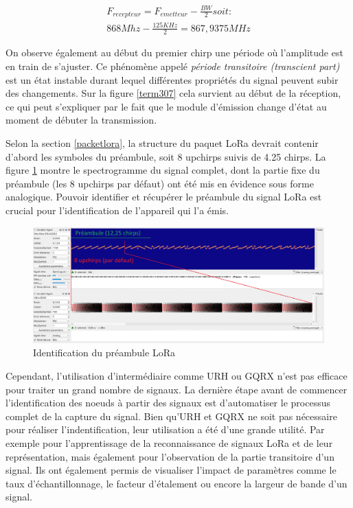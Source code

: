 \begin{align}
    F_{recepteur} = F_{emetteur} - \frac{BW}{2} soit: \\
    868Mhz - \frac{125KHz}{2} = 867,9375MHz
\end{align}

On observe également au début du premier chirp une période où l'amplitude est en train de s'ajuster. Ce phénomène appelé \textit{période transitoire (transcient part)} est un état instable durant lequel différentes propriétés du signal peuvent subir des changements. Sur la figure \ref{term307} cela survient au début de la réception, ce qui peut s'expliquer par le fait que le module d'émission change d'état au moment de débuter la transmission.

\vspace{0.1cm}

Selon la section \ref{packetlora}, la structure du paquet LoRa devrait contenir d'abord les symboles du préambule, soit 8 upchirps suivis de 4.25 chirps. La figure \ref{term308} montre le spectrogramme du signal complet, dont la partie fixe du préambule (les 8 upchirps par défaut) ont été mis en évidence sous forme analogique. Pouvoir identifier et récupérer le préambule du signal LoRa est crucial pour l'identification de l'appareil qui l'a émis.


\begin{figure}[h]
\centering

\includegraphics[scale=0.18]{images/urh6.png}
\caption{Identification du préambule LoRa}\label{term308}
\end{figure}

Cependant, l'utilisation d'intermédiaire comme URH ou GQRX n'est pas efficace pour traiter un grand nombre de signaux. La dernière étape avant de commencer l'identification des noeuds à partir des signaux est d'automatiser le processus complet de la capture du signal. Bien qu'URH et GQRX ne soit pas nécessaire pour réaliser l'indentification, leur utilisation a été d'une grande utilité. Par exemple pour l'apprentissage de la reconnaissance de signaux LoRa et de leur représentation, mais également pour l'observation de la partie transitoire d'un signal. Ils ont également permis de visualiser l'impact de paramètres comme le taux d'échantillonnage, le facteur d'étalement ou encore la largeur de bande d'un signal.


